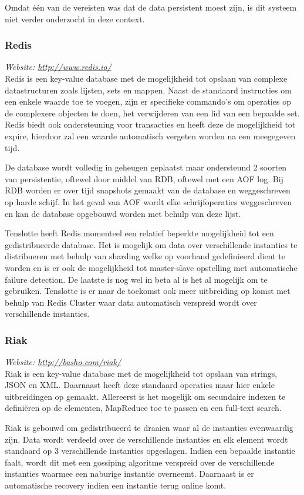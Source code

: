 Omdat één van de vereisten was dat de data persistent moest zijn, is dit systeem niet verder onderzocht in deze context. 

\subsubsection{Redis}
\textit{Website: \url{http://www.redis.io/}}\\
Redis is een key-value database met de mogelijkheid tot opslaan van complexe datastructuren zoals lijsten, sets en mappen. Naast de standaard instructies om een enkele waarde toe te voegen, zijn er specifieke commando's om operaties op de complexere objecten te doen, het verwijderen van een lid van een bepaalde set. Redis biedt ook ondersteuning voor transacties en heeft deze de mogelijkheid tot expire, hierdoor zal een waarde automatisch vergeten worden na een meegegeven tijd. 

De database wordt volledig in geheugen geplaatst maar ondersteund 2 soorten van persistentie, oftewel door middel van RDB, oftewel met een AOF log. Bij RDB worden er over tijd snapshots gemaakt van de database en weggeschreven op harde schijf. In het geval van AOF wordt elke schrijfoperaties weggeschreven en kan de database opgebouwd worden met behulp van deze lijst.

Tenslotte heeft Redis momenteel een relatief beperkte mogelijkheid tot een gedistribueerde database. Het is mogelijk om data over verschillende instanties te distribueren met behulp van sharding welke op voorhand gedefinieerd dient te worden en is er ook de mogelijkheid tot master-slave opstelling met automatische failure detection.
De laatste is nog wel in beta al is het al mogelijk om te gebruiken. Tenslotte is er naar de toekomst ook meer uitbreiding op komst met behulp van Redis Cluster waar data automatisch verspreid wordt over verschillende instanties. 

\subsubsection{Riak}
\textit{Website: \url{http://basho.com/riak/}}\\
Riak is een key-value database met de mogelijkheid tot opslaan van strings, JSON en XML. Daarnaast heeft deze standaard operaties maar hier enkele uitbreidingen op gemaakt. Allereerst is het mogelijk om secundaire indexen te definiëren op de elementen, MapReduce toe te passen en een full-text search. 

Riak is gebouwd om gedistribueerd te draaien waar al de instanties evenwaardig zijn. Data wordt verdeeld over de verschillende instanties en elk element wordt standaard op 3 verschillende instanties opgeslagen. Indien een bepaalde instantie faalt, wordt dit met een gossiping algoritme verspreid over de verschillende instanties waarmee een naburige instantie overneemt. Daarnaast is er automatische recovery indien een instantie terug online komt. 

